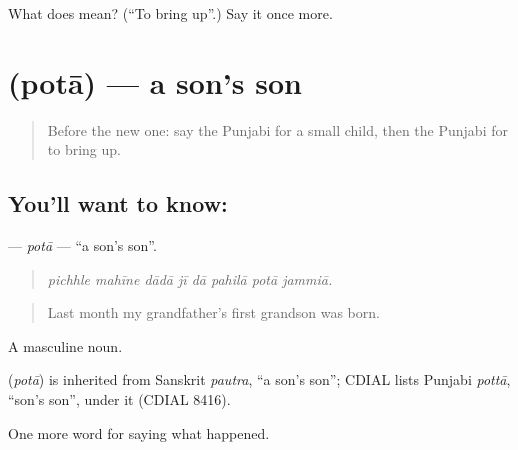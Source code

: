 \begin{tcolorbox}[breakable,colback=teal!4,colframe=teal!35!black,title={Before you move on}]
What does  mean? (\textquotedblleft{}To bring up\textquotedblright{}.) Say it once more.
\end{tcolorbox}
\section[\texorpdfstring{\pa{ਪੋਤਾ} (potā)}{ਪੋਤਾ (potā)}]{ (potā) — a son's son}

\label{lesson:PA-C314-pota}



\begin{quote}
Before the new one: say the Punjabi for a small child, then the Punjabi for to bring up.
\end{quote}

\subsection*{You'll want to know: }
\textbf{} — \emph{potā} — \textquotedblleft{}a son's son\textquotedblright{}.

\begin{quote}
       
\end{quote}

\begin{quote}
\emph{pichhle mahīne dādā jī dā pahilā potā jammiā.}
\end{quote}

\begin{quote}
Last month my grandfather's first grandson was born.
\end{quote}

A masculine noun.

\begin{cousinweb}
\textbf{} (\emph{potā}) is inherited from Sanskrit \emph{pautra}, \textquotedblleft{}a son's son\textquotedblright{}; CDIAL lists Punjabi \emph{pottā}, \textquotedblleft{}son's son\textquotedblright{}, under it (CDIAL 8416).
\end{cousinweb}

\begin{grammarlens}[title={What you've built}]
One more word for saying what happened.
\end{grammarlens}


